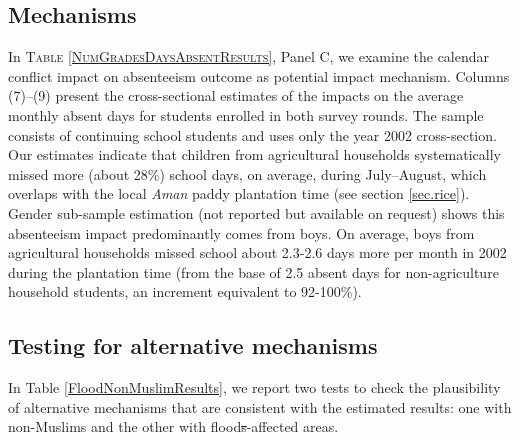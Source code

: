 \documentclass[12pt,letterpaper]{article}
\newcommand{\0}{\ensuremath{\mbox{\boldmath $0$}}}
\begin{document}
\subsection{Mechanisms}

In \textsc{\small Table \ref{NumGradesDaysAbsentResults}}, Panel C, we examine the calendar conflict impact on absenteeism outcome as potential impact mechanism. Columns (7)–(9) present the cross-sectional estimates of the impacts on the average monthly absent days for students enrolled in both survey rounds. The sample consists of continuing school students and uses only the year 2002 cross-section. Our estimates indicate that children from agricultural households systematically missed more (about 28\%) school days, on average, during July–August, which overlaps with the local \textit{Aman} paddy plantation time (see section \ref{sec.rice}). Gender sub-sample estimation (not reported but available on request) shows this absenteeism impact predominantly comes from boys. On average, boys from agricultural households missed school about 2.3-2.6 days more per month in 2002 during the plantation time (from the base of 2.5 absent days for non-agriculture household students, an increment equivalent to 92-100\%). 





\subsection{Testing for alternative mechanisms}

In Table \ref{FloodNonMuslimResults}, we report two tests to check the plausibility of alternative mechanisms that are consistent with the estimated results: one with non-Muslims and the other with flood\sout{s}-affected areas. 
\end{document}
